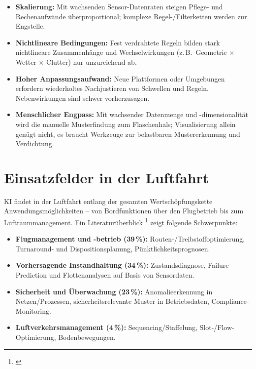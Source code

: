 \medskip
\begin{itemize}
  \item \textbf{Skalierung:} Mit wachsenden Sensor-Datenraten steigen Pflege- und Rechenaufwände überproportional; komplexe Regel-/Filterketten werden zur Engstelle.
  \item \textbf{Nichtlineare Bedingungen:} Fest verdrahtete Regeln bilden stark nichtlineare Zusammenhänge und Wechselwirkungen (z.\,B.\ Geometrie $\times$ Wetter $\times$ Clutter) nur unzureichend ab.
  \item \textbf{Hoher Anpassungsaufwand:} Neue Plattformen oder Umgebungen erfordern wiederholtes Nachjustieren von Schwellen und Regeln. Nebenwirkungen sind schwer vorherzusagen.
  \item \textbf{Menschlicher Engpass:} Mit wachsender Datenmenge und -dimensionalität wird die manuelle Musterfindung zum Flaschenhals; Visualisierung allein genügt nicht, es braucht Werkzeuge zur belastbaren Mustererkennung und Verdichtung.
\end{itemize}






\section{Einsatzfelder in der Luftfahrt}\label{sec:sop-ueberblick}
KI findet in der Luftfahrt entlang der gesamten Wertschöpfungskette Anwendungsmöglichkeiten – von Bordfunktionen 
über den Flugbetrieb bis zum Luftraummanagement. Ein Literaturüberblick \footnote{ \parencite{ml-meets-aerospace-2024}} 
zeigt folgende Schwerpunkte:

\medskip
\begin{itemize}
  \item \textbf{Flugmanagement und -betrieb (39\,\%):} Routen-/Treibstoffoptimierung, Turnaround- und Dispositionsplanung, Pünktlichkeitsprognosen.
  \item \textbf{Vorhersagende Instandhaltung (34\,\%):} Zustandsdiagnose, Failure Prediction und Flottenanalysen auf Basis von Sensordaten.
  \item \textbf{Sicherheit und Überwachung (23\,\%):} Anomalieerkennung in Netzen/Prozessen, sicherheitsrelevante Muster in Betriebsdaten, Compliance-Monitoring.
  \item \textbf{Luftverkehrsmanagement (4\,\%):} Sequencing/Staffelung, Slot-/Flow-Optimierung, Bodenbewegungen.
\end{itemize}



